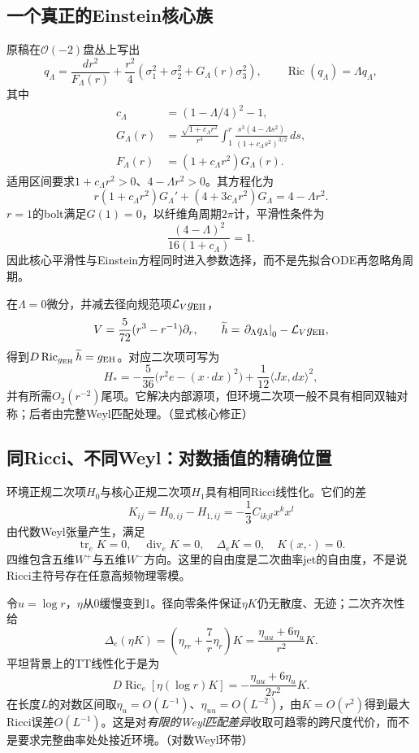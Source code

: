 \documentclass[UTF8,fontset=fandol,zihao=-4]{ctexart}
\theoremstyle{research}
\DeclareMathOperator{\Ric}{Ric}
\DeclareMathOperator{\tr}{tr}
\DeclareMathOperator{\diver}{div}
\numberwithin{equation}{section}
\begin{document}
\subsection{一个真正的Einstein核心族}
原稿在$\mathcal O(-2)$盘丛上写出
\[
q_\Lambda=\frac{dr^2}{F_\Lambda(r)}+
\frac{r^2}{4}(\sigma_1^2+\sigma_2^2+G_\Lambda(r)\sigma_3^2),
\qquad\Ric(q_\Lambda)=\Lambda q_\Lambda,
\]
其中
\begin{align}
c_\Lambda&=(1-\Lambda/4)^2-1,\\
G_\Lambda(r)&=\frac{\sqrt{1+c_\Lambda r^2}}{r^4}
\int_1^r\frac{s^3(4-\Lambda s^2)}{(1+c_\Lambda s^2)^{3/2}}\,ds,\\
F_\Lambda(r)&=(1+c_\Lambda r^2)G_\Lambda(r).
\end{align}
适用区间要求$1+c_\Lambda r^2>0$、$4-\Lambda r^2>0$。其方程化为
\[
r(1+c_\Lambda r^2)G_\Lambda'+(4+3c_\Lambda r^2)G_\Lambda=4-\Lambda r^2.
\]
$r=1$的bolt满足$G(1)=0$，以纤维角周期$2\pi$计，平滑性条件为
\[
\frac{(4-\Lambda)^2}{16(1+c_\Lambda)}=1.
\]
因此核心平滑性与Einstein方程同时进入参数选择，而不是先拟合ODE再忽略角周期。

在$\Lambda=0$微分，并减去径向规范项$\mathcal L_Vg_{\rm EH}$，
\[
V=\frac5{72}(r^3-r^{-1})\partial_r,
\qquad \widetilde h=\left.\partial_\Lambda q_\Lambda\right|_0-\mathcal L_Vg_{\rm EH},
\]
得到$D\Ric_{g_{\rm EH}}\widetilde h=g_{\rm EH}$。对应二次项可写为
\[
H_*=-\frac5{36}\bigl(r^2e-(x\cdot dx)^2\bigr)
+\frac1{12}\langle Jx,dx\rangle^2,
\]
并有所需$O_2(r^{-2})$尾项。它解决内部源项，但环境二次项一般不具有相同双轴对称；后者由完整Weyl匹配处理。\cite{C}（显式核心修正）\cite{CGLP}

\subsection{同Ricci、不同Weyl：对数插值的精确位置}
环境正规二次项$H_0$与核心正规二次项$H_1$具有相同Ricci线性化。它们的差
\[
K_{ij}=H_{0,ij}-H_{1,ij}=-\frac13C_{ikjl}x^kx^l
\]
由代数Weyl张量产生，满足
\[
\tr_eK=0,\quad\diver_eK=0,\quad\Delta_eK=0,
\quad K(x,\cdot)=0.
\]
四维包含五维$W^+$与五维$W^-$方向。这里的自由度是二次曲率jet的自由度，不是说Ricci主符号存在任意高频物理零模。

令$u=\log r$，$\eta$从0缓慢变到1。径向零条件保证$\eta K$仍无散度、无迹；二次齐次性给
\[
\Delta_e(\eta K)=\left(\eta_{rr}+\frac7r\eta_r\right)K
=\frac{\eta_{uu}+6\eta_u}{r^2}K.
\]
平坦背景上的TT线性化于是为
\begin{equation}\label{eq:logweyl}
\boxed{D\Ric_e[\eta(\log r)K]
=-\frac{\eta_{uu}+6\eta_u}{2r^2}K.}
\end{equation}
在长度$L$的对数区间取$\eta_u=O(L^{-1})$、$\eta_{uu}=O(L^{-2})$，由$K=O(r^2)$得到最大Ricci误差$O(L^{-1})$。这是对\emph{有限的Weyl匹配差异}收取可趋零的跨尺度代价，而不是要求完整曲率处处接近环境。\cite{C}（对数Weyl环带）
\end{document}
